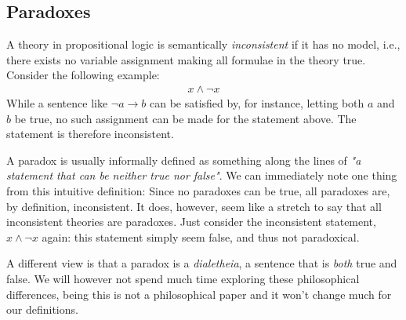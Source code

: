 \subsection{Paradoxes}
\label{sub:Paradoxes}
A theory in propositional logic is semantically \textit{inconsistent} if it has no model, i.e., there exists no variable assignment making all formulae in the theory true.
Consider the following example:
\begin{align}
  x \wedge \neg x
\end{align}
While a sentence like $\neg a \rightarrow b$ can be satisfied by, for instance, letting both $a$ and $b$ be true, no such assignment can be made for the statement above.
The statement is therefore inconsistent.

A paradox is usually informally defined as something along the lines of \textit{"a statement that can be neither true nor false"}.
We can immediately note one thing from this intuitive definition:
Since no paradoxes can be true, all paradoxes are, by definition, inconsistent.
It does, however, seem like a stretch to say that all inconsistent theories are paradoxes.  Just consider the inconsistent statement, $x \wedge \neg x$ again: this statement simply seem false, and thus not paradoxical.

A different view is that a paradox is a \textit{dialetheia}, a sentence that is \textit{both} true and false\cite{sep-dialetheism}. We will however not spend much time exploring these philosophical differences, being this is not a philosophical paper and it won't change much for our definitions.

